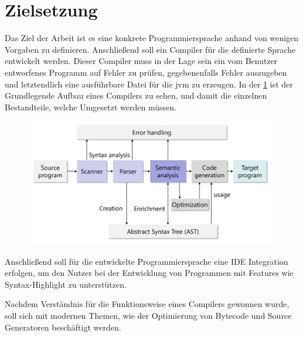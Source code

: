 \section{Zielsetzung}
Das Ziel der Arbeit ist es eine konkrete Programmiersprache anhand von wenigen Vorgaben zu definieren. Anschließend soll ein Compiler für die definierte Sprache entwickelt werden. Dieser Compiler muss in der Lage sein ein vom Benutzer entworfenes Programm auf Fehler zu prüfen, gegebenenfalls Fehler auszugeben und letztendlich eine ausführbare Datei für die \ac{jvm} zu erzeugen. In der \cref{pic:CompilerAufbau} ist der Grundlegende Aufbau eines Compilers zu sehen, und damit die einzelnen Bestandteile, welche Umgesetzt werden müssen.

\begin{figure}[h!]
	\centering
	\includegraphics[width=12cm]{content/pictures/compiler.png}
	\label{pic:CompilerAufbau}
\end{figure}

Anschließend soll für die entwickelte Programmiersprache eine IDE Integration erfolgen, um den Nutzer bei der Entwicklung von Programmen mit Features wie Syntax-Highlight zu unterstützen.

Nachdem Verständnis für die Funktionsweise eines Compilers gewonnen wurde, soll sich mit modernen Themen, wie der Optimierung von Bytecode und Source Generatoren beschäftigt werden.